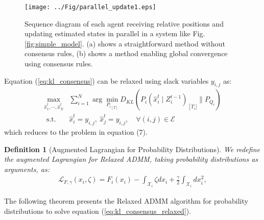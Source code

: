\documentclass[a4paper,10pt]{paper_template}
\newtheorem{definition}{Definition}
\begin{document}
\begin{figure}[t]
	\begin{center}
		\texttt{[image: ../Fig/parallel\_update1.eps]}
		\caption{Sequence diagram of each agent receiving relative positions and updating estimated states in parallel in a system like Fig. \ref{fig:simple_model}. (a) shows a straightforward method without consensus rules, (b) shows a method enabling global convergence using consensus rules.}
		\label{fig:parallel_update}
	\end{center}
	\vspace{-2mm}
\end{figure}

Equation (\ref{eq:kl_consensus}) can be relaxed using slack variables $y_{i,j}$ as:
\begin{equation}
\begin{aligned}
\max _{\hat x_{1}^{t}, \cdots, \hat x_{N}^{t}} & \sum_{i=1}^{N} \arg \min _{{P_{i}}_{[T]}} D_{K L}\left(P_{i}\left(\hat x_{i}^{t} \mid Z_{i}^{t-1}\right)_{\left[T_{i}]\right.} \| P_{Q_{i}} \right) \\
\text { s.t. } & \hat x_{i}^{t}=y_{i,j}, \:\hat x_{j}^{t}=y_{i,j}, \quad\forall(i, j) \in \mathcal{E}
\label{eq:kl_consensus_relaxed}
\end{aligned}
\end{equation}
which reduces to the problem in equation (7).

\begin{definition}[Augmented Lagrangian for Probability Distributions]
We redefine the augmented Lagrangian for Relaxed ADMM, taking probability distributions as arguments, as:
\begin{equation}
\begin{aligned}
 {\mathcal{ L}}_{F,\gamma}(x_i, \zeta) 
 = F_i(x_i) - \int_{{\mathcal{X}}_i}
\zeta dx_i + \frac{\gamma}{2}\int_{{\mathcal{X}}_i} dx_i^2,
\label{eq:relaxed_lagrangian}
\end{aligned}
\end{equation}
\end{definition}

The following theorem presents the Relaxed ADMM algorithm for probability distributions to solve equation (\ref{eq:kl_consensus_relaxed}).
\end{document}
